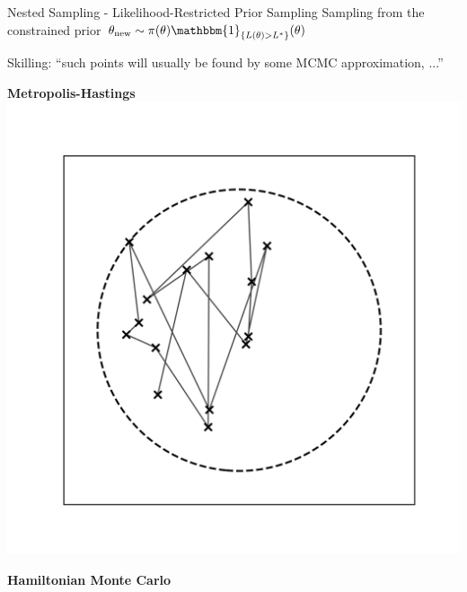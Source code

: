 \documentclass[]{beamer}
\begin{document}
  \begin{frame}{Nested Sampling - Likelihood-Restricted Prior Sampling}
    Sampling from the constrained prior $\theta_{\textnormal{new}} \sim \pi(\theta) \mathbbm{1}_{\{L(\theta) > L^*\}}(\theta)$
    
    Skilling: ``such points will usually be found by some MCMC approximation, ...'' \cite[6]{skilling}
    \vspace{0.3cm}

    \centering
    \begin{minipage}{0.45\textwidth}
      \centering
      \textbf{Metropolis-Hastings}
      \vspace{0.5cm}
      \includegraphics[trim={1.5cm, 1.3cm, 1.1cm, 1.5cm}, clip, scale=0.4]{figs/metropolis_example.png}
    \end{minipage}
    \begin{minipage}{0.45\textwidth}
      \centering
      \textbf{Hamiltonian Monte Carlo}
      \vspace{0.5cm}

\end{minipage}
\end{frame}
\end{document}
